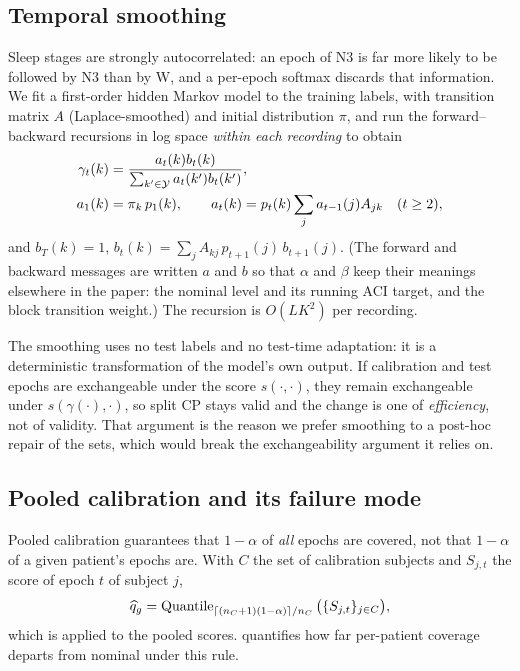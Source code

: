 \subsection{Temporal smoothing}
\label{sec:method-smoothing}

Sleep stages are strongly autocorrelated: an epoch of N3 is far more likely
to be followed by N3 than by W, and a per-epoch softmax discards that
information. We fit a first-order hidden Markov model to the training labels,
with transition matrix $A$ (Laplace-smoothed) and initial distribution $\pi$,
and run the forward--backward recursions in log space \emph{within each
recording} to obtain
\begin{equation}
\begin{aligned}
\gamma_t(k)&=\frac{a_t(k)b_t(k)}{\sum_{k'\in\mathcal{Y}}a_t(k')b_t(k')},\\
a_1(k)&=\pi_k\,p_1(k),\qquad
a_t(k)=p_t(k)\sum_{j}a_{t-1}(j)A_{jk}\quad(t\ge2),
\end{aligned}
\label{eq:forward-backward}
\end{equation}
and $b_T(k)=1$,
$b_t(k)=\sum_{j}A_{kj}\,p_{t+1}(j)\,b_{t+1}(j)$. (The forward and backward messages are
written $a$ and $b$ so that $\alpha$ and $\beta$ keep their meanings elsewhere
in the paper: the nominal level and its running ACI target, and the block
transition weight.) The recursion is $O(LK^2)$ per recording.

The smoothing uses no test labels and no test-time adaptation: it is a
deterministic transformation of the model's own output. If calibration and
test epochs are exchangeable under the score $s(\cdot,\cdot)$, they remain
exchangeable under $s(\gamma(\cdot),\cdot)$, so split CP stays valid and the
change is one of \emph{efficiency}, not of validity. That argument is the
reason we prefer smoothing to a post-hoc repair of the sets, which would
break the exchangeability argument it relies on.

\subsection{Pooled calibration and its failure mode}
\label{sec:method-pooled}

Pooled calibration guarantees that $1-\alpha$ of \emph{all} epochs are
covered, not that $1-\alpha$ of a given patient's epochs are. With $C$ the
set of calibration subjects and $S_{j,t}$ the score of epoch $t$ of subject
$j$,
\begin{equation}
\widehat{q}_g=\operatorname{Quantile}_{\lceil(n_C+1)(1-\alpha)\rceil/n_C}
\big(\{S_{j,t}\}_{j\in C}\big),
\label{eq:global-q}
\end{equation}
which is  applied to the pooled scores. 
quantifies how far per-patient coverage departs from nominal under this rule.

